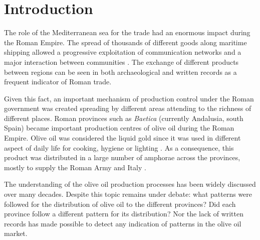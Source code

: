 \documentclass[review]{elsarticle}
\newcommand{\memo}[2]{\textcolor{#1}{#2}}
\newcommand{\xavi}[1]{\memo{magenta}{XRC: #1\\}}
\begin{document}
\section{Introduction}


The role of the Mediterranean sea for the trade had an enormous impact during the Roman Empire. The spread of thousands of different goods along maritime shipping allowed a progressive exploitation of communication networks and a major interaction between communities \citep{rodriguez_baetican_1998, 
temin_market_2001,
bevan_mediterranean_2014}. The exchange of different products between regions can be seen in both archaeological and written records as a frequent indicator of Roman trade.  


Given this fact, an important mechanism of production control under the Roman government was created spreading by different areas attending to the richness of different places. Roman provinces such as \textit{Baetica} (currently Andalusia, south Spain) became important production centres of olive oil during the Roman Empire. Olive oil was considered the liquid gold since it was used in different aspect of daily life for cooking, hygiene or lighting  \citep{mattingly_d.j._oil_1988}. As a consequence, this product was distributed in a large number of amphorae across the provinces, mostly to supply the Roman Army and Italy \citep{blazquez_exportacion_1980}. 


The understanding of the olive oil production processes has been widely discussed over many decades\citep{rodriguez_economioleicola_1977, Chic_hispania_1997,millet_anforas_1998}. Despite this topic remains under debate: what patterns were followed for the distribution of olive oil to the different provinces?
Did each province follow a different pattern for its distribution? Nor the lack of written records has made possible to detect any indication of patterns in the olive oil market.
\end{document}
